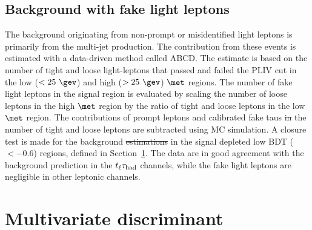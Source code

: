 \documentclass[PAPER, coverpage, atlasdraft=true, texlive=2016, UKenglish]{\ATLASLATEXPATH atlasdoc}
\providecommand{\DIFadd}[1]{{\protect\color{blue}\uwave{#1}}} %
\providecommand{\DIFdel}[1]{{\protect\color{red}\sout{#1}}}                      %
\providecommand{\DIFaddbegin}{} %
\providecommand{\DIFaddend}{} %
\providecommand{\DIFdelbegin}{} %
\providecommand{\DIFdelend}{} %
\begin{document}
\subsection{Background with fake light leptons}
The background originating from non-prompt or misidentified light leptons is primarily from the multi-jet production.
The contribution from these events is estimated with a data-driven method called ABCD.
The estimate is based on the number of tight and loose light-leptons that passed and failed the PLIV cut in the low ($<25~\gev$) and high
($>25~\gev$) $\met$ regions. The number of
fake light leptons in the signal region is evaluated by scaling the number of loose leptons in the high $\met$ region by the ratio of tight and loose leptons in the
low $\met$ region. The contributions of prompt leptons and calibrated fake taus \DIFdelbegin \DIFdel{in }\DIFdelend \DIFaddbegin \DIFadd{to }\DIFaddend the number of tight and loose leptons are subtracted using MC simulation.
A closure test is made for the background \DIFdelbegin \DIFdel{estimations }\DIFdelend \DIFaddbegin \DIFadd{estimates }\DIFaddend in the signal depleted low BDT ($<-0.6$) regions, defined in Section~\ref{sec:tmva}.
The data are in good agreement with the background prediction in the
$t_{\ell}\tau_{\mathrm{had}}$ channels, while the fake light leptons are negligible in other leptonic channels. 


\section{Multivariate discriminant}
\label{sec:tmva}
\end{document}
